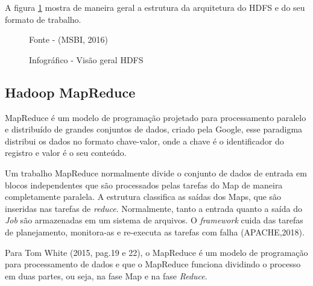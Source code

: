 A figura \ref{Fig:Estrutura HDFS} mostra de maneira geral a estrutura da arquitetura do HDFS e do seu formato de trabalho. 


\begin{figure}[htbp!] \begin{center}
\caption{Infográfico - Visão geral HDFS }
\small{Fonte - (MSBI, 2016)}
\label{Fig:Estrutura HDFS}
\end{center} \end{figure}


\subsection{Hadoop MapReduce}

MapReduce é um modelo de programação projetado para processamento paralelo e distribuído de grandes conjuntos de dados, criado pela Google, esse paradigma distribui os dados no formato chave-valor, onde a chave é o identificador do registro e valor é o seu conteúdo.


Um trabalho MapReduce normalmente divide o conjunto de dados de entrada em blocos independentes que são processados pelas tarefas do Map de maneira completamente paralela. A estrutura classifica as saídas dos Maps, que são inseridas nas tarefas de \textit{reduce}. Normalmente, tanto a entrada quanto a saída do \textit{Job} são armazenadas em um sistema de arquivos. O \textit{framework} cuida das tarefas de planejamento, monitora-as e re-executa as tarefas com falha (APACHE,2018).

Para Tom White (2015, pag.19 e 22), o MapReduce é um modelo de programação para processamento de dados e que o MapReduce funciona dividindo o processo em duas partes, ou seja, na fase Map e na fase \textit{Reduce}.

